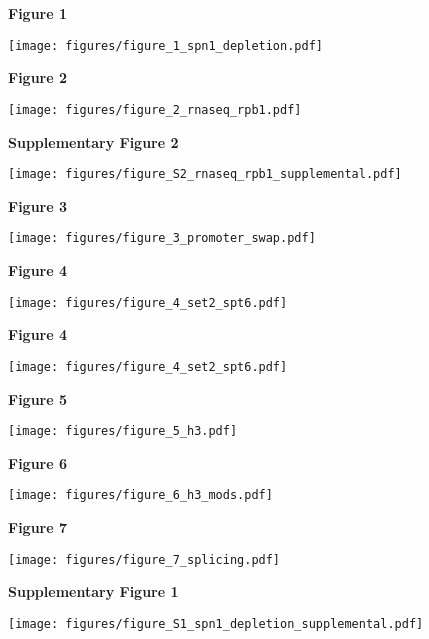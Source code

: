 \documentclass[9pt, letterpaper]{extarticle}
\begin{document}
\textbf{\large Figure 1}

{\centering \texttt{[image: figures/figure\_1\_spn1\_depletion.pdf]}\par}

\newpage

\textbf{\large Figure 2}

{\centering \texttt{[image: figures/figure\_2\_rnaseq\_rpb1.pdf]}\par}

\newpage

\textbf{\large Supplementary Figure 2}

{\centering \texttt{[image: figures/figure\_S2\_rnaseq\_rpb1\_supplemental.pdf]}\par}

\newpage

\textbf{\large Figure 3}

{\texttt{[image: figures/figure\_3\_promoter\_swap.pdf]}\par}

\newpage

\textbf{\large Figure 4}

{\centering \texttt{[image: figures/figure\_4\_set2\_spt6.pdf]}\par}

\newpage

\textbf{\large Figure 4}

{\centering \texttt{[image: figures/figure\_4\_set2\_spt6.pdf]}\par}

\newpage

\textbf{\large Figure 5}

{\texttt{[image: figures/figure\_5\_h3.pdf]}\par}

\newpage

\textbf{\large Figure 6}

{\centering \texttt{[image: figures/figure\_6\_h3\_mods.pdf]}\par}

\newpage

\textbf{\large Figure 7}

{\centering \texttt{[image: figures/figure\_7\_splicing.pdf]}\par}

\newpage

\textbf{\large Supplementary Figure 1}

{\centering \texttt{[image: figures/figure\_S1\_spn1\_depletion\_supplemental.pdf]}\par}
\end{document}
